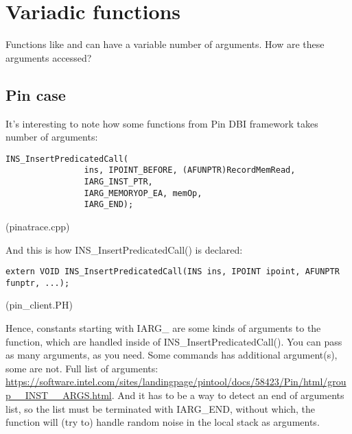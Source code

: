\section{Variadic functions}

Functions like \printf and \scanf can have a variable number of arguments.
How are these arguments accessed?




\subsection{Pin case}

It's interesting to note how some functions from Pin \ac{DBI} framework takes number of arguments:

\begin{lstlisting}[style=customc]
            INS_InsertPredicatedCall(
                ins, IPOINT_BEFORE, (AFUNPTR)RecordMemRead,
                IARG_INST_PTR,
                IARG_MEMORYOP_EA, memOp,
                IARG_END);
\end{lstlisting}
(pinatrace.cpp)

And this is how INS\_InsertPredicatedCall() is declared:

\begin{lstlisting}[style=customc]
extern VOID INS_InsertPredicatedCall(INS ins, IPOINT ipoint, AFUNPTR funptr, ...);
\end{lstlisting}
(pin\_client.PH)

Hence, constants starting with IARG\_ are some kinds of arguments to the function,
which are handled inside of INS\_InsertPredicatedCall().
You can pass as many arguments, as you need.
Some commands has additional argument(s), some are not.
Full list of arguments:
\url{https://software.intel.com/sites/landingpage/pintool/docs/58423/Pin/html/group__INST__ARGS.html}.
And it has to be a way to detect an end of arguments list, so the list must be terminated with IARG\_END, without which,
the function will (try to) handle random noise in the local stack as arguments.



